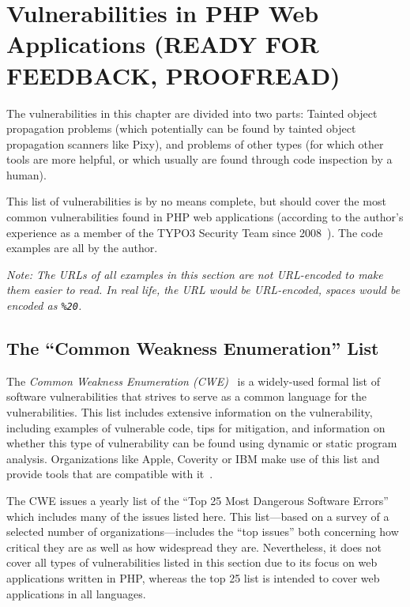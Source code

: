 \chapter{Vulnerabilities in PHP Web Applications (READY FOR FEEDBACK, PROOFREAD)}
\label{vulnerabilities}

The vulnerabilities in this chapter are divided into two parts: Tainted object propagation problems (which potentially can be found by tainted object propagation scanners like Pixy), and problems of other types (for which other tools are more helpful, or which usually are found through code inspection by a human).

This list of vulnerabilities is by no means complete, but should cover the most common vulnerabilities found in PHP web applications (according to the author's experience as a member of the TYPO3 Security Team since 2008~\cite{security-team-members}). The code examples are all by the author.

\emph{Note: The URLs of all examples in this section are not URL-encoded to make them easier to read. In real life, the URL would be URL-encoded, \eg spaces would be encoded as \texttt{\%20}.}

\section{The ``Common Weakness Enumeration'' List}
The \emph{Common Weakness Enumeration (CWE)}~\cite{cwe} is a widely-used formal list of software vulnerabilities that strives to serve as a common language for the vulnerabilities. This list includes extensive information on the vulnerability, including examples of vulnerable code, tips for mitigation, and information on whether this type of vulnerability can be found using dynamic or static program analysis. Organizations like Apple, Coverity or IBM make use of this list and provide tools that are compatible with it~\cite{cwe-organizations}.

The CWE issues a yearly list of the ``Top 25 Most Dangerous Software Errors''~\cite{cwe-top-25} which includes many of the issues listed here. This list---based on a survey of a selected number of organizations---includes the ``top issues'' both concerning how critical they are as well as how widespread they are. Nevertheless, it does not cover all types of vulnerabilities listed in this section due to its focus on web applications written in PHP, whereas the top 25 list is intended to cover web applications in all languages.

